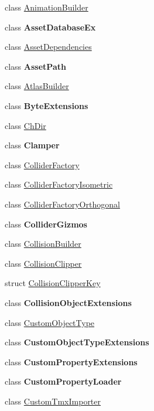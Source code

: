 \begin{DoxyCompactItemize}
\item 
class \mbox{\hyperlink{class_super_tiled2_unity_1_1_editor_1_1_animation_builder}{Animation\+Builder}}
\item 
class {\bfseries Asset\+Database\+Ex}
\item 
class \mbox{\hyperlink{class_super_tiled2_unity_1_1_editor_1_1_asset_dependencies}{Asset\+Dependencies}}
\item 
class {\bfseries Asset\+Path}
\item 
class \mbox{\hyperlink{class_super_tiled2_unity_1_1_editor_1_1_atlas_builder}{Atlas\+Builder}}
\item 
class {\bfseries Byte\+Extensions}
\item 
class \mbox{\hyperlink{class_super_tiled2_unity_1_1_editor_1_1_ch_dir}{Ch\+Dir}}
\item 
class {\bfseries Clamper}
\item 
class \mbox{\hyperlink{class_super_tiled2_unity_1_1_editor_1_1_collider_factory}{Collider\+Factory}}
\item 
class \mbox{\hyperlink{class_super_tiled2_unity_1_1_editor_1_1_collider_factory_isometric}{Collider\+Factory\+Isometric}}
\item 
class \mbox{\hyperlink{class_super_tiled2_unity_1_1_editor_1_1_collider_factory_orthogonal}{Collider\+Factory\+Orthogonal}}
\item 
class {\bfseries Collider\+Gizmos}
\item 
class \mbox{\hyperlink{class_super_tiled2_unity_1_1_editor_1_1_collision_builder}{Collision\+Builder}}
\item 
class \mbox{\hyperlink{class_super_tiled2_unity_1_1_editor_1_1_collision_clipper}{Collision\+Clipper}}
\item 
struct \mbox{\hyperlink{struct_super_tiled2_unity_1_1_editor_1_1_collision_clipper_key}{Collision\+Clipper\+Key}}
\item 
class {\bfseries Collision\+Object\+Extensions}
\item 
class \mbox{\hyperlink{class_super_tiled2_unity_1_1_editor_1_1_custom_object_type}{Custom\+Object\+Type}}
\item 
class {\bfseries Custom\+Object\+Type\+Extensions}
\item 
class {\bfseries Custom\+Property\+Extensions}
\item 
class {\bfseries Custom\+Property\+Loader}
\item 
class \mbox{\hyperlink{class_super_tiled2_unity_1_1_editor_1_1_custom_tmx_importer}{Custom\+Tmx\+Importer}}

\end{DoxyCompactItemize}
